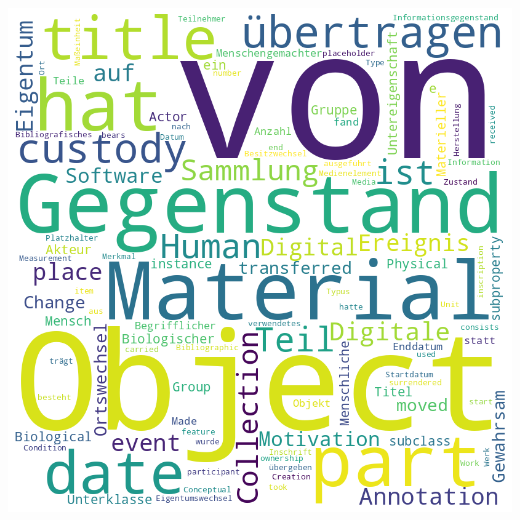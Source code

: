 \documentclass[
  a4paper,
]{book}
\begin{document}
\includegraphics{section_files/figure-pdf/cell-5-output-1.png}


\backmatter
\end{document}
